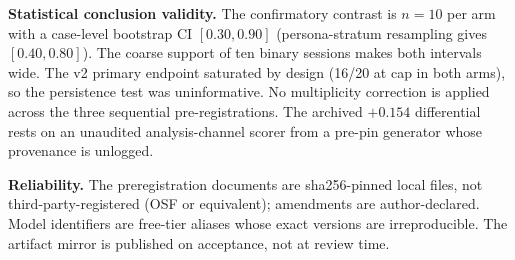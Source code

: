 \textbf{Statistical conclusion validity.} The confirmatory contrast is
$n{=}10$ per arm with a case-level bootstrap CI $[0.30, 0.90]$
(persona-stratum resampling gives $[0.40, 0.80]$). The coarse support
of ten binary sessions makes both intervals wide. The v2 primary
endpoint saturated by design (16/20 at cap in both arms), so the
persistence test was uninformative. No multiplicity correction is
applied across the three sequential pre-registrations. The archived
$+0.154$ differential rests on an unaudited analysis-channel scorer
from a pre-pin generator whose provenance is unlogged.

\textbf{Reliability.} The preregistration documents are
sha256-pinned local files, not third-party-registered (OSF or
equivalent); amendments are author-declared. Model identifiers are
free-tier aliases whose exact versions are irreproducible. The
artifact mirror is published on acceptance, not at review time.
